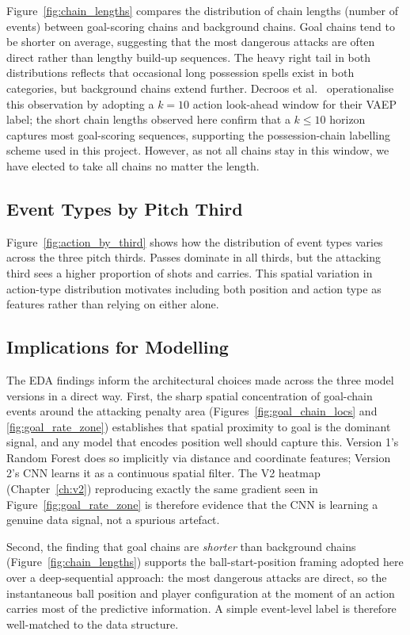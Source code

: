 Figure~\ref{fig:chain_lengths} compares the distribution of chain lengths (number of events) between goal-scoring chains and background chains. Goal chains tend to be shorter on average, suggesting that the most dangerous attacks are often direct rather than lengthy build-up sequences. The heavy right tail in both distributions reflects that occasional long possession spells exist in both categories, but background chains extend further. Decroos et al.~\cite{decroos2019} operationalise this observation by adopting a $k = 10$ action look-ahead window for their VAEP label; the short chain lengths observed here confirm that a $k \leq 10$ horizon captures most goal-scoring sequences, supporting the possession-chain labelling scheme used in this project. However, as not all chains stay in this window, we have elected to take all chains no matter the length.


\subsection{Event Types by Pitch Third}

Figure~\ref{fig:action_by_third} shows how the distribution of event types varies across the three pitch thirds. Passes dominate in all thirds, but the attacking third sees a higher proportion of shots and carries. This spatial variation in action-type distribution motivates including both position and action type as features rather than relying on either alone.

\subsection{Implications for Modelling}

The EDA findings inform the architectural choices made across the three model versions in a direct way. First, the sharp spatial concentration of goal-chain events around the attacking penalty area (Figures~\ref{fig:goal_chain_locs} and \ref{fig:goal_rate_zone}) establishes that spatial proximity to goal is the dominant signal, and any model that encodes position well should capture this. Version 1's Random Forest does so implicitly via distance and coordinate features; Version 2's CNN learns it as a continuous spatial filter. The V2 heatmap (Chapter~\ref{ch:v2}) reproducing exactly the same gradient seen in Figure~\ref{fig:goal_rate_zone} is therefore evidence that the CNN is learning a genuine data signal, not a spurious artefact.

Second, the finding that goal chains are \emph{shorter} than background chains (Figure~\ref{fig:chain_lengths}) supports the ball-start-position framing adopted here over a deep-sequential approach: the most dangerous attacks are direct, so the instantaneous ball position and player configuration at the moment of an action carries most of the predictive information. A simple event-level label is therefore well-matched to the data structure.

